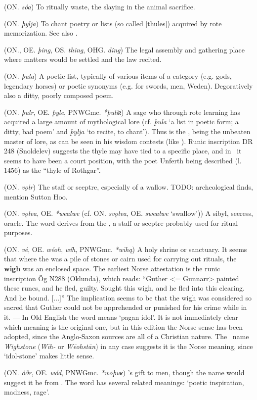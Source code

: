 \begin{itemize}
 (ON. \emph{sóa})
  To ritually waste, the slaying in the animal sacrifice.

 (ON. \emph{þylja})
  To chant poetry or lists (so called [thules]) acquired by rote memorization. See also .

 (ON., OE. \emph{þing}, OS. \emph{thing}, OHG. \emph{ding})
  The legal assembly and gathering place where matters would be settled and the law recited.

 (ON. \emph{þula})
  A poetic list, typically of various items of a category (e.g. gods, legendary horses) or poetic synonyms (e.g. for swords, men, Weden). Degoratively also a ditty, poorly composed poem.

 (ON. \emph{þulr}, OE. \emph{þyle}, PNWGmc. \emph{*þuliʀ})
  A sage who through rote learning has acquired a large amount of mythological lore (cf. \emph{þula} ‘a list in poetic form; a ditty, bad poem’ and \emph{þylja} ‘to recite, to chant’). Thus  is the , being the unbeaten master of lore, as can be seen in his wisdom contests (like \Vafthrudnismal). Runic inscription DR 248 (Snoldelev) suggests the thyle may have tied to a specific place, and in \Beowulf\ it seems to have been a court position, with the poet Unferth being described (l. 1456) as the “thyle of Rothgar”.

 (ON. \emph{vǫlr})
  The staff or sceptre, especially of a wallow. TODO: archeological finds, mention Sutton Hoo.

 (ON. \emph{vǫlva}, OE. \emph{*wealwe} (cf. ON. \emph{svǫlva}, OE. \emph{swealwe} ‘swallow’))
  A sibyl, seeress, oracle. The word derives from the , a staff or sceptre probably used for ritual purposes.

 (ON. \emph{vé}, OE. \emph{wéoh}, \emph{wíh}, PNWGmc. \emph{*wīhą})
  A holy shrine or sanctuary. It seems that where the  was a pile of stones or cairn used for carrying out rituals, the \textbf{wigh} was an enclosed space. The earliest Norse attestation is the runic inscription Ög N288 (Oklunda), which reads: “Guther <= Gunnarr> painted these runes, and he fled, guilty. Sought this wigh, and he fled into this clearing. And he bound. [...]” The implication seems to be that the wigh was considered so sacred that Guther could not be apprehended or punished for his crime while in it. — In Old English the word means ‘pagan idol’. It is not immediately clear which meaning is the original one, but in this edition the Norse sense has been adopted, since the Anglo-Saxon sources are all of a Christian nature. The \Beowulf\ name \emph{Wighstone} (\emph{Wīh-} or \emph{Wēohstān}) in any case suggests it is the Norse meaning, since ‘idol-stone’ makes little sense.

 (ON. \emph{óðr}, OE. \emph{wód}, PNWGmc. \emph{*wōþuʀ})
  ’s gift to men, though the name would suggest it be from . The word has several related meanings: ‘poetic inspiration, madness, rage’.

\end{itemize}


